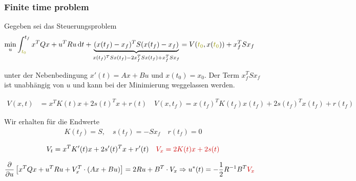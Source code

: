 \documentclass[a4paper, 12pt]{scrartcl}
\newcommand{\rot}[2][rot]{\textcolor{#1}{#2}}
\newcommand{\dunkelgelb}[2][dunkelgelb]{\textcolor{#1}{#2}}
\newcommand{\dt}{\thinspace \mathrm{d}t}
\begin{document}
\subsubsection{Finite time problem}

Gegeben sei das Steuerungsproblem 
%
\begin{align*}
\min_u &  \int_{\dunkelgelb{t_0}}^{t_f} x^T Q x + u^T R u \dt + \underbrace{(x(t_f)- x_f)^T S (x(t_f)- x_f)}_{x(t_f)^T S x(t_f) -2x_{f}^T S x(t_f) +x_{f}^{T} S x_f} 
= V(\dunkelgelb{t_0},x(\dunkelgelb{t_0})) + x_{f}^{T} S x_f
\end{align*}

unter der Nebenbedingung $x'(t) = Ax+Bu$ und $x(t_0) = x_0$. Der Term $x_{f}^{T} S x_f$ ist unabhängig von $u$ und kann bei der Minimierung weggelassen werden.

%
\begin{align*}
V(x,t) 	&= x^T K(t) x + 2 s(t)^T x +r(t) \quad V(x,t_f) = x(t_f)^T K(t_f) x(t_f) + 2 s(t_f)^T x(t_f) + r(t_f)
\end{align*}

Wir erhalten für die Endwerte
%
\begin{align*}
K(t_f) = S, \quad s(t_f) = - S x_f \quad r(t_f) = 0
\end{align*}

%
\begin{align*}
V_t = x^T K'(t) x + 2 s'(t)^T x +r'(t) \quad \rot{V_x = 2K(t)x +2s(t)} 
\end{align*}


%
\begin{align*}
\frac{\partial}{\partial u} \left[ x^T Q x + u^T R u + V_x^T \cdot (Ax+Bu) \right] &= 2Ru + B^T \cdot V_x \Rightarrow u^{*}(t) = - \frac{1}{2} R^{-1} B^T \rot{V_x}
\end{align*}

%
\end{document}
